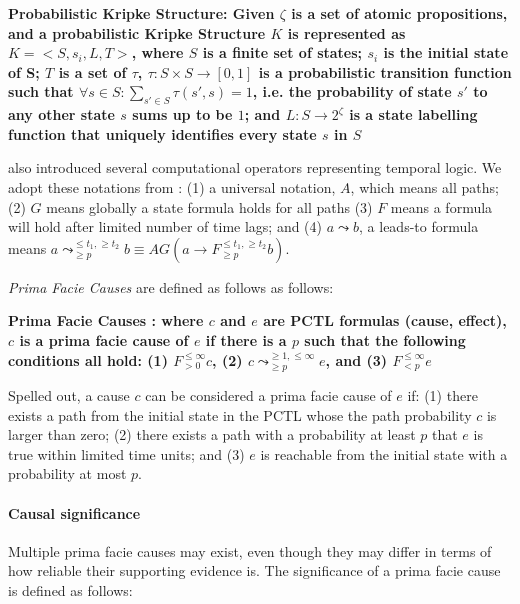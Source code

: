 \begin{defn} \textbf{Probabilistic Kripke Structure: Given $\zeta$ is a set of atomic propositions, and a probabilistic Kripke Structure $K$ is represented as $K=<S,s_{i},L,T>$, where $S$ is a finite set of states; $s_{i}$ is the initial state of S;  $T$ is a set of $\tau$, $\tau : S \times S \rightarrow [0,1]$ is a probabilistic transition function such that $\forall s \in S: \sum_{{s}' \in S} \tau ({s}',s) = 1$, i.e. the probability of state ${s}'$ to any other state $s$ sums up to be $1$; and $L:S \rightarrow 2^{\zeta}$ is a state labelling function that uniquely identifies every state $s$ in $S$}
\end{defn}

\textcite{hansson1994logic} also introduced several computational operators representing temporal logic. We adopt these notations from \textcite{kleinberg_uai09,kleinberg2012causality}: (1) a universal notation, $A$, which means all paths; (2) $G$ means globally a state formula holds for all paths (3) $F$ means a formula will hold after limited number of time lags; and (4) $a \leadsto b$, a leads-to formula means $a \leadsto _{\geq p}^{\leq t_{1}, \geq t_{2}} b \equiv AG (a \rightarrow F_{\geq p}^{\leq t_{1}, \geq t_{2}} b)$.

\emph{Prima Facie Causes} are defined as follows as follows:

\begin{defn} \textbf{Prima Facie Causes \parencite{kleinberg_uai09}: where $c$ and $e$ are PCTL formulas (cause, effect), $c$ is a prima facie cause of $e$ if there is a $p$ such that the following conditions all hold: (1) $F_{> 0}^{\leq \infty }c$, (2) $c\leadsto_{\geq p}^{\geq 1,\leq \infty}e$, and (3) $F_{<p}^{\leq \infty }e$}
\end{defn}

Spelled out, a cause $c$ can be considered a prima facie cause of $e$ if: (1) there exists a path from the initial state in the PCTL whose the path probability $c$ is larger than zero; (2) there exists a path with a probability at least $p$ that $e$ is true within limited time units; and (3) $e$ is reachable from the initial state with a probability at most $p$.

\paragraph{Causal significance}
Multiple prima facie causes may exist, even though they may differ in terms of how reliable their supporting evidence is. The significance of a prima facie cause is defined as follows:

